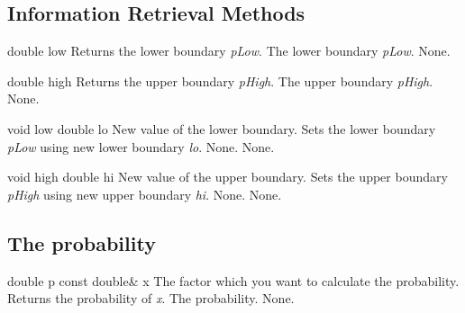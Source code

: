 \vspace*{10mm}

\subsection{Information Retrieval Methods}

\setConstInstance
\printEmptyMethodReturnSpecial
{double}
{low}
{Returns the lower boundary {\em pLow}.}
{The lower boundary {\em pLow}.}
{None.}

\setConstInstance
\printEmptyMethodReturnSpecial
{double}
{high}
{Returns the upper boundary {\em pHigh}.}
{The upper boundary {\em pHigh}.}
{None.}

\setNormalInstance
\printMethodWithOneParam
{void}
{low}
{double}
{lo}
{New value of the lower boundary.}
{Sets the lower boundary {\em pLow} using new lower boundary {\em lo}.}
{None.}
{None.}

\clearpage

\setNormalInstance
\printMethodWithOneParam
{void}
{high}
{double}
{hi}
{New value of the upper boundary.}
{Sets the upper boundary {\em pHigh} using new upper boundary {\em hi}.}
{None.}
{None.}

\vspace*{10mm}

\subsection{The probability}

\setConstInstance
\printMethodWithOneParam
{double}
{p}
{const double\&}
{x}
{The factor which you want to calculate the probability.}
{Returns the probability of {\em x}.}
{The probability.}
{None.}













